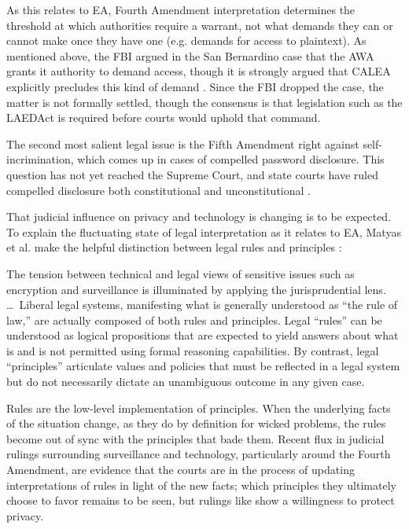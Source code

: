 As this relates to \ac{EA}, Fourth Amendment interpretation determines the threshold at which authorities require a
warrant, not what demands they can or cannot make once they have one (e.g. demands for access to \ac{plaintext}). As
mentioned above, the FBI argued in the San Bernardino case that the \ac{AWA} grants it authority to demand access,
though it is strongly argued that \acs{CALEA} explicitly precludes this kind of demand \cite{gidari_2016}. Since the FBI
dropped the case, the matter is not formally settled, though the consensus is that legislation such as the \ac{LAEDAct}
is required before courts would uphold that command.

The second most salient legal issue is the Fifth Amendment right against self-incrimination, which comes up in cases of
compelled password disclosure. This question has not yet reached the Supreme Court, and state courts have ruled
compelled disclosure both constitutional \cite{sobel_2019} \cite{lee_nj_2020} and unconstitutional \cite{lee_its_2020}
\cite{vaas_2019}.

That judicial influence on privacy and technology is changing is to be expected. To explain the fluctuating state of
legal interpretation as it relates to \ac{EA}, Matyas et al. make the helpful distinction between legal rules and
principles \cite{matyas_incommensurability_2018}:

\begin{displayquote}
The tension between technical and legal views of sensitive issues such as encryption and surveillance is illuminated by
applying the jurisprudential lens. \dots~Liberal legal systems, manifesting what is generally understood as ``the rule
of law,'' are actually composed of both rules and principles. Legal ``rules'' can be understood as logical propositions
that are expected to yield answers about what is and is not permitted using formal reasoning capabilities. By contrast,
legal ``principles'' articulate values and policies that must be reflected in a legal system but do not necessarily
dictate an unambiguous outcome in any given case.
\end{displayquote}

Rules are the low-level implementation of principles. When the underlying facts of the situation change, as they do by
definition for wicked problems, the rules become out of sync with the principles that bade them. Recent flux in judicial
rulings surrounding surveillance and technology, particularly around the Fourth Amendment, are evidence that the courts
are in the process of updating interpretations of rules in light of the new facts; which principles they ultimately
choose to favor remains to be seen, but rulings like  show a willingness to protect privacy.

